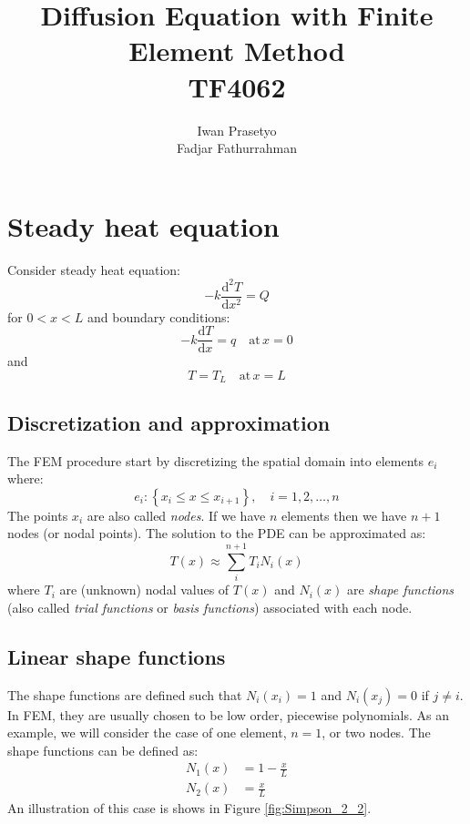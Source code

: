 \documentclass[a4paper,12pt]{article} %
\begin{document}
\title{Diffusion Equation with Finite Element Method \\
TF4062}
\author{Iwan Prasetyo \\
Fadjar Fathurrahman}
\date{}
\maketitle


\section{Steady heat equation}

Consider steady heat equation:
\begin{equation}
-k \frac{\mathrm{d}^2 T}{\mathrm{d}x^2} = Q
\end{equation}
for $0 < x < L$ and boundary conditions:
\begin{equation}
-k\frac{\mathrm{d}T}{\mathrm{d}x} = q \quad \text{at} \, x = 0
\end{equation}
and
\begin{equation}
T = T_{L} \quad \text{at} \, x = L
\end{equation}

\subsection{Discretization and approximation}

The FEM procedure start by discretizing the spatial domain into elements $e_{i}$
where:
\begin{equation}
e_{i}: \left\{ x_{i} \leq x \leq x_{i+1} \right\},\quad i=1,2,\ldots,n
\end{equation}
The points $x_{i}$ are also called \textit{nodes}. If we have $n$ elements then we
have $n+1$ nodes (or nodal points).
The solution to the PDE can be approximated as:
\begin{equation}
T(x) \approx \sum_{i}^{n+1} T_{i} N_{i}(x)
\end{equation}
where $T_i$ are (unknown) nodal values of $T(x)$ and $N_{i}(x)$ are \textit{shape functions}
(also called \textit{trial functions} or \textit{basis functions}) associated with each node.


\subsection{Linear shape functions}
The shape functions are defined such that $N_{i}(x_{i}) = 1$ and $N_{i}(x_{j})=0$
if $j \neq i$. In FEM, they are usually chosen to be low order, piecewise polynomials.
As an example, we will consider the case of one element, $n=1$, or two nodes. The shape functions
can be defined as:
\begin{align}
N_{1}(x) & = 1 - \frac{x}{L} \\
N_{2}(x) & = \frac{x}{L}
\end{align}
An illustration of this case is shows in Figure \ref{fig:Simpson_2_2}.
\end{document}
